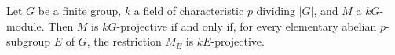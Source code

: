 Let $G$ be a finite group, $k$ a field of characteristic $p$ dividing $|G|$, and $M$ a $kG$-module. Then $M$ is $kG$-projective if and only if, for every elementary abelian $p$-subgroup $E$ of $G$, the restriction $M_E$ is $kE$-projective.
